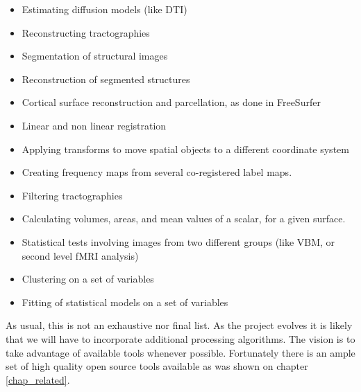\begin{itemize}
\item Estimating diffusion models (like DTI)
\item Reconstructing tractographies
\item Segmentation of structural images
\item Reconstruction of segmented structures
\item Cortical surface reconstruction and parcellation, as done in FreeSurfer
\item Linear and non linear registration
\item Applying transforms to move spatial objects to a different coordinate system
\item Creating frequency maps from several co-registered label maps.
\item Filtering tractographies
\item Calculating volumes, areas, and mean values of a scalar, for a given surface.
\item Statistical tests involving images from two different groups (like VBM, or second level fMRI analysis)
\item Clustering on a set of variables
\item Fitting of statistical models on a set of variables
\end{itemize}

As usual, this is not an exhaustive nor final list. As the project evolves it is likely that we will have to incorporate additional processing algorithms. The vision is to take advantage of available tools whenever possible. Fortunately there is an ample set of high quality open source tools available as was shown on chapter \ref{chap_related}.


